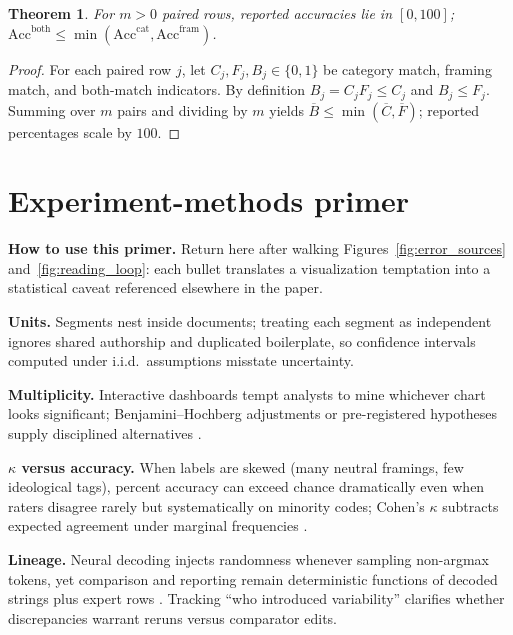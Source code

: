 \documentclass[11pt,a4paper]{article}
\newtheorem{theorem}{Theorem}[section]
\theoremstyle{remark}
\begin{document}
\begin{theorem}
\label{thm:acc}
For $m>0$ paired rows, reported accuracies lie in $[0,100]$; $\mathrm{Acc}^{\mathrm{both}}\le \min(\mathrm{Acc}^{\mathrm{cat}},\mathrm{Acc}^{\mathrm{fram}})$.
\end{theorem}
\begin{proof}
For each paired row $j$, let $C_j,F_j,B_j\in\{0,1\}$ be category match, framing match, and both-match indicators. By definition $B_j=C_j F_j\le C_j$ and $B_j\le F_j$. Summing over $m$ pairs and dividing by $m$ yields $\overline{B}\le \min(\overline{C},\overline{F})$; reported percentages scale by $100$.
\end{proof}

\section{Experiment-methods primer}
\label{app:primer}

\textbf{How to use this primer.} Return here after walking Figures~\ref{fig:error_sources} and~\ref{fig:reading_loop}: each bullet translates a visualization temptation into a statistical caveat referenced elsewhere in the paper.

\textbf{Units.} Segments nest inside documents; treating each segment as independent ignores shared authorship and duplicated boilerplate, so confidence intervals computed under i.i.d.\ assumptions misstate uncertainty.

\textbf{Multiplicity.} Interactive dashboards tempt analysts to mine whichever chart looks significant; Benjamini--Hochberg adjustments or pre-registered hypotheses supply disciplined alternatives \citep{benjamini1995controlling}.

\textbf{$\kappa$ versus accuracy.} When labels are skewed (many neutral framings, few ideological tags), percent accuracy can exceed chance dramatically even when raters disagree rarely but systematically on minority codes; Cohen's $\kappa$ subtracts expected agreement under marginal frequencies \citep{cohen1960coefficient,carletta1996assessing}.

\textbf{Lineage.} Neural decoding injects randomness whenever sampling non-argmax tokens, yet comparison and reporting remain deterministic functions of decoded strings plus expert rows \citep{norton2026ocrprovenance}. Tracking ``who introduced variability'' clarifies whether discrepancies warrant reruns versus comparator edits.
\end{document}
